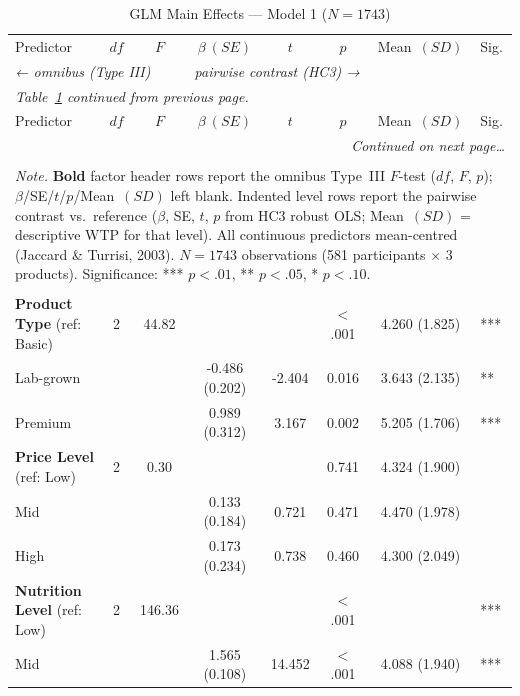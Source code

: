\begin{center}
\begin{longtable}{lccccccl}
\caption{GLM Main Effects --- Model 1 ($N=1743$)}\label{tab:glm_main} \\
\toprule
Predictor & $df$ & $F$ & $\beta\ (SE)$ & $t$ & $p$ & Mean\ $(SD)$ & Sig. \\
\multicolumn{3}{l}{\scriptsize\textit{← omnibus (Type III)}} & \multicolumn{4}{l}{\scriptsize\textit{pairwise contrast (HC3) →}} & \\
\midrule
\endfirsthead
\multicolumn{8}{l}{\textit{Table~\ref{tab:glm_main} continued from previous page.}} \\
\toprule
Predictor & $df$ & $F$ & $\beta\ (SE)$ & $t$ & $p$ & Mean\ $(SD)$ & Sig. \\
\midrule
\endhead
\midrule
\multicolumn{8}{r}{\textit{Continued on next page\ldots}} \\
\endfoot
\multicolumn{8}{l}{$R^2 = 0.146$,\quad Adj.\ $R^2 = 0.130$} \\
\bottomrule
\multicolumn{8}{p{0.95\linewidth}}{\footnotesize \textit{Note.} \textbf{Bold} factor header rows report the omnibus Type~III $F$-test ($df$, $F$, $p$); $\beta$/SE/$t$/$p$/Mean~$(SD)$ left blank. Indented level rows report the pairwise contrast vs.\ reference ($\beta$, SE, $t$, $p$ from HC3 robust OLS; Mean~$(SD)$ = descriptive WTP for that level). All continuous predictors mean-centred (Jaccard \& Turrisi, 2003). $N=1743$ observations (581 participants $\times$ 3 products). Significance: *** $p<.01$, ** $p<.05$, * $p<.10$.} \\
\endlastfoot
\multicolumn{8}{l}{\textit{Product Attributes}} \\
\quad \textbf{Product Type} (ref: Basic) & 2 & 44.82 & & & $<$.001 & 4.260 (1.825) & *** \\
\qquad Lab-grown & & & -0.486 (0.202) & -2.404 & 0.016 & 3.643 (2.135) & ** \\
\qquad Premium & & & 0.989 (0.312) & 3.167 & 0.002 & 5.205 (1.706) & *** \\
\quad \textbf{Price Level} (ref: Low) & 2 & 0.30 & & & 0.741 & 4.324 (1.900) &  \\
\qquad Mid & & & 0.133 (0.184) & 0.721 & 0.471 & 4.470 (1.978) &  \\
\qquad High & & & 0.173 (0.234) & 0.738 & 0.460 & 4.300 (2.049) &  \\
\quad \textbf{Nutrition Level} (ref: Low) & 2 & 146.36 & & & $<$.001 &  & *** \\
\qquad Mid & & & 1.565 (0.108) & 14.452 & $<$.001 & 4.088 (1.940) & *** \\

\end{longtable}
\end{center}
